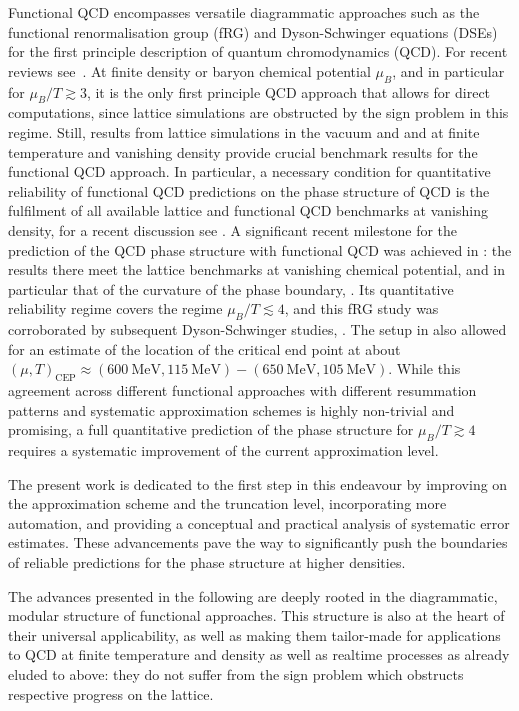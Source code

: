 \documentclass[aps,twocolumn,prd,superscriptaddress]{revtex4-2}
\begin{document}
Functional QCD encompasses versatile diagrammatic approaches such as the functional renormalisation group (fRG) and Dyson-Schwinger equations (DSEs) for the first principle description of quantum chromodynamics (QCD). For recent reviews see~\cite{Dupuis:2020fhh, Fu:2022gou, Fischer:2018sdj}. At finite density or baryon chemical potential $\mu_B$, and in particular for $\mu_B/T\gtrsim 3$, it is the only first principle QCD approach that allows for direct computations, since lattice simulations are obstructed by the sign problem in this regime. Still, results from lattice simulations in the vacuum and and at finite temperature and vanishing density provide crucial benchmark results for the functional QCD approach. In particular, a necessary condition for quantitative reliability of functional QCD predictions on the phase structure of QCD is the fulfilment of all available lattice and functional QCD benchmarks at vanishing density, for a recent discussion see \cite{Fu:2023lcm}. A significant recent milestone for the prediction of the QCD phase structure with functional QCD was achieved in \cite{Fu:2019hdw}: the results there meet the lattice benchmarks at vanishing chemical potential, and in particular that of the curvature of the phase boundary, \cite{Fu:2023lcm, Bernhardt:2023ezo}. Its quantitative reliability regime covers the regime $\mu_B / T \lesssim 4$, and this fRG study was corroborated by subsequent Dyson-Schwinger studies, \cite{Gao:2020qsj, Gao:2020fbl, Gunkel:2021oya}. The setup in \cite{Fu:2019hdw, Gao:2020qsj, Gao:2020fbl, Gunkel:2021oya} also allowed for an estimate of the location of the critical end point at about $(\mu, T)_\textrm{CEP} \approx  (\qty{600}{\MeV}, \qty{115}{\MeV}) -(\qty{650}{\MeV}, \qty{105}{\MeV})$. While this agreement across different functional approaches with different resummation patterns and systematic approximation schemes is highly non-trivial and promising, a full quantitative prediction of the phase structure for $\mu_B/T \gtrsim 4$ requires a systematic improvement of the current approximation level. 

The present work is dedicated to the first step in this endeavour by improving on the approximation scheme and the truncation level, incorporating more automation, and providing a conceptual and practical analysis of systematic error estimates. These advancements pave the way to significantly push the boundaries of reliable predictions for the phase structure at higher densities. 

The advances presented in the following are deeply rooted in the diagrammatic, modular structure of functional approaches. This structure is also at the heart of their universal applicability, as well as making them tailor-made for applications to QCD at finite temperature and density as well as realtime processes as already eluded to above: they do not suffer from the sign problem which obstructs respective progress on the lattice. 
\end{document}

